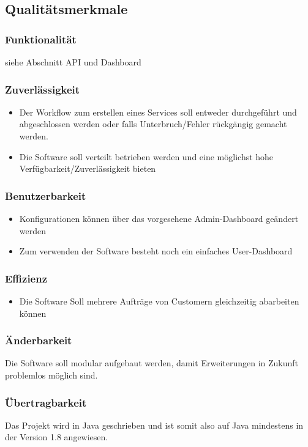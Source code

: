 \documentclass[11pt]{scrartcl}
\begin{document}
\subsection{Qualitätsmerkmale}
\subsubsection{Funktionalität}
siehe Abschnitt API und Dashboard
\subsubsection{Zuverlässigkeit}
\begin{itemize}
  \item Der Workflow zum erstellen eines Services soll entweder durchgeführt und 
  abgeschlossen werden oder falls Unterbruch/Fehler rückgängig gemacht 
  werden.
  \item Die Software soll verteilt betrieben werden und eine möglichst hohe 
  Verfügbarkeit/Zuverlässigkeit bieten
\end{itemize}
\subsubsection{Benutzerbarkeit}
\begin{itemize}
  \item Konfigurationen können über das vorgesehene Admin-Dashboard geändert werden
  \item Zum verwenden der Software besteht noch ein einfaches 
  User-Dashboard
\end{itemize}
\subsubsection{Effizienz}
\begin{itemize}
  \item Die Software Soll mehrere Aufträge von Customern gleichzeitig abarbeiten können
\end{itemize}
\subsubsection{Änderbarkeit}
Die Software soll modular aufgebaut werden, damit Erweiterungen in Zukunft 
problemlos möglich sind.
\subsubsection{Übertragbarkeit}
Das Projekt wird in Java geschrieben und ist somit also auf Java mindestens in der Version 
1.8 angewiesen.
\end{document}
